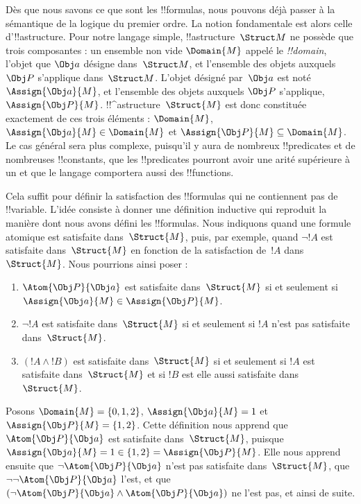 \documentclass[../../../include/open-logic-section]{subfiles}
\begin{document}


Dès que nous savons ce que sont les !!{formula}s, nous pouvons déjà
passer à la sémantique de la logique du premier ordre. La notion
fondamentale est alors celle d'!!a{structure}. Pour notre langage
simple, !!a{structure}~$\Struct M$ ne possède que trois composantes :
un ensemble non vide $\Domain{M}$ appelé le \emph{!!{domain}}, l'objet
que $\Obj a$ désigne dans~$\Struct M$, et l'ensemble des objets auxquels
$\Obj P$ s'applique dans~$\Struct M$. L'objet désigné par~$\Obj a$ est
noté~$\Assign{\Obj a}{M}$, et l'ensemble des objets auxquels $\Obj P$
s'applique,~$\Assign{\Obj P}{M}$. !!^a{structure}~$\Struct{M}$ est donc
constituée exactement de ces trois éléments :
$\Domain{M}$, $\Assign{\Obj a}{M} \in \Domain{M}$ et
$\Assign{\Obj P}{M} \subseteq \Domain{M}$. Le cas général sera plus
complexe, puisqu'il y aura de nombreux !!{predicate}s et de nombreuses
!!{constant}s, que les !!{predicate}s pourront avoir une arité supérieure à un
et que le langage comportera aussi des !!{function}s.

Cela suffit pour définir la satisfaction des !!{formula}s qui ne
contiennent pas de !!{variable}. L'idée consiste à donner une définition
inductive qui reproduit la manière dont nous avons défini les
!!{formula}s. Nous indiquons quand une formule atomique est satisfaite
dans~$\Struct{M}$, puis, par exemple, quand $\lnot !A$ est satisfaite
dans~$\Struct{M}$ en fonction de la satisfaction de~$!A$
dans~$\Struct{M}$. Nous
pourrions ainsi poser :
\begin{enumerate}
  \item $\Atom{\Obj P}{\Obj a}$ est satisfaite dans~$\Struct{M}$ si et
  seulement si $\Assign{\Obj a}{M} \in \Assign{\Obj P}{M}$.
  \item $\lnot !A$ est satisfaite dans~$\Struct{M}$ si et seulement si
  $!A$ n'est pas satisfaite dans~$\Struct{M}$.
  \item $(!A \land !B)$ est satisfaite dans~$\Struct{M}$ si et
  seulement si $!A$ est satisfaite dans~$\Struct{M}$ et si $!B$ est
  elle aussi satisfaite dans~$\Struct{M}$.
\end{enumerate}
Posons $\Domain{M} = \{0, 1, 2\}$,
$\Assign{\Obj a}{M} = 1$ et
$\Assign{\Obj P}{M} = \{1, 2\}$. Cette définition nous apprend que
$\Atom{\Obj P}{\Obj a}$ est satisfaite dans~$\Struct{M}$, puisque
$\Assign{\Obj a}{M} = 1 \in \{1,2\} = \Assign{\Obj P}{M}$. Elle nous
apprend ensuite que $\lnot \Atom{\Obj P}{\Obj a}$ n'est pas satisfaite
dans~$\Struct{M}$, que
$\lnot\lnot \Atom{\Obj P}{\Obj a}$ l'est, et que
$(\lnot \Atom{\Obj P}{\Obj a} \land \Atom{\Obj P}{\Obj a})$ ne l'est
pas, et ainsi de suite.
\end{document}
